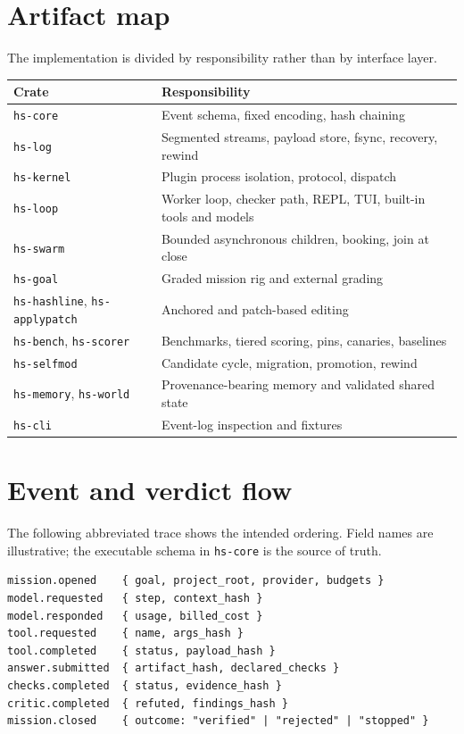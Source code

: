 \documentclass[10pt,letterpaper]{article}
\newcommand{\code}[1]{\texttt{\small #1}}
\begin{document}
\appendix
\section{Artifact map}
The implementation is divided by responsibility rather than by interface layer.
\begin{table}[htbp]\small
\begin{tabularx}{\linewidth}{p{.22\linewidth}Y}\hline
Crate & Responsibility\\\hline
\code{hs-core} & Event schema, fixed encoding, hash chaining\\
\code{hs-log} & Segmented streams, payload store, fsync, recovery, rewind\\
\code{hs-kernel} & Plugin process isolation, protocol, dispatch\\
\code{hs-loop} & Worker loop, checker path, REPL, TUI, built-in tools and models\\
\code{hs-swarm} & Bounded asynchronous children, booking, join at close\\
\code{hs-goal} & Graded mission rig and external grading\\
\code{hs-hashline}, \code{hs-applypatch} & Anchored and patch-based editing\\
\code{hs-bench}, \code{hs-scorer} & Benchmarks, tiered scoring, pins, canaries, baselines\\
\code{hs-selfmod} & Candidate cycle, migration, promotion, rewind\\
\code{hs-memory}, \code{hs-world} & Provenance-bearing memory and validated shared state\\
\code{hs-cli} & Event-log inspection and fixtures\\\hline
\end{tabularx}
\end{table}

\section{Event and verdict flow}
The following abbreviated trace shows the intended ordering. Field names are illustrative; the executable schema in \code{hs-core} is the source of truth.
\begin{verbatim}
mission.opened    { goal, project_root, provider, budgets }
model.requested   { step, context_hash }
model.responded   { usage, billed_cost }
tool.requested    { name, args_hash }
tool.completed    { status, payload_hash }
answer.submitted  { artifact_hash, declared_checks }
checks.completed  { status, evidence_hash }
critic.completed  { refuted, findings_hash }
mission.closed    { outcome: "verified" | "rejected" | "stopped" }
\end{verbatim}
\end{document}
